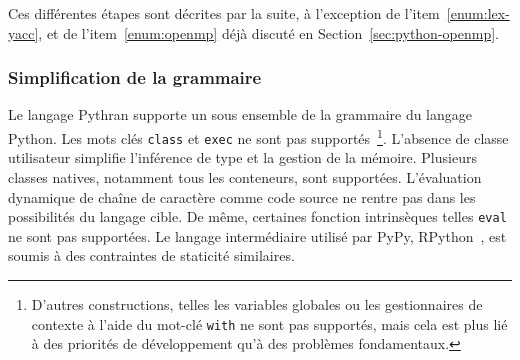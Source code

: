\documentclass[renpar]{compas2013}
\begin{document}
Ces différentes étapes sont décrites par la suite, à l'exception de
l'item~\ref{enum:lex-yacc}, et de l'item~\ref{enum:openmp} déjà discuté en
Section~\ref{sec:python-openmp}.

\subsubsection{Simplification de la grammaire}

Le langage Pythran supporte un sous ensemble de la grammaire du langage
Python. Les mots clés \texttt{class} et \texttt{exec} ne sont pas
supportés~\footnote{D'autres constructions, telles les variables globales
ou les gestionnaires de contexte à l'aide du mot-clé \texttt{with} ne sont
pas supportés, mais cela est plus lié à des priorités de développement
qu'à des problèmes fondamentaux.}. L'absence de classe utilisateur
simplifie l'inférence de type et la gestion de la mémoire. Plusieurs
classes natives, notamment tous les conteneurs, sont supportées.
L'évaluation dynamique de chaîne de caractère comme code source ne rentre
pas dans les possibilités du langage cible. De même, certaines fonction
intrinsèques telles \texttt{eval} ne sont pas supportées. Le langage
intermédiaire utilisé par PyPy, RPython~\cite{rpython2007}, est soumis à
des contraintes de staticité similaires.
\end{document}
